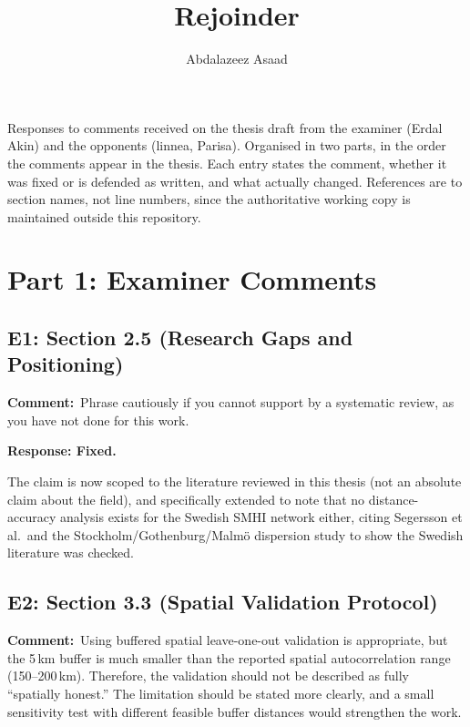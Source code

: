\documentclass[11pt,a4paper]{article}
\title{Rejoinder}
\author{Abdalazeez Asaad}
\date{}
\newcommand{\rjcomment}[1]{\par\noindent\textbf{Comment:}\ #1\par}
\newcommand{\rjresponse}[1]{\par\noindent\textbf{Response: #1}\par}
\begin{document}
\maketitle

Responses to comments received on the thesis draft from the examiner (Erdal Akin) and the
opponents (linnea, Parisa). Organised in two parts, in the order the comments appear in the
thesis. Each entry states the comment, whether it was fixed or is defended as written, and
what actually changed. References are to section names, not line numbers, since the
authoritative working copy is maintained outside this repository.

\section{Part 1: Examiner Comments}

\subsection{E1: Section 2.5 (Research Gaps and Positioning)}

\rjcomment{Phrase cautiously if you cannot support by a systematic review, as you have not
done for this work.}

\rjresponse{Fixed.}
The claim is now scoped to the literature reviewed in this thesis (not an absolute claim about
the field), and specifically extended to note that no distance-accuracy analysis exists for the
Swedish SMHI network either, citing Segersson et al.\ and the Stockholm/Gothenburg/Malm\"o
dispersion study to show the Swedish literature was checked.

\subsection{E2: Section 3.3 (Spatial Validation Protocol)}

\rjcomment{Using buffered spatial leave-one-out validation is appropriate, but the 5\,km buffer
is much smaller than the reported spatial autocorrelation range (150--200\,km). Therefore, the
validation should not be described as fully ``spatially honest.'' The limitation should be
stated more clearly, and a small sensitivity test with different feasible buffer distances would
strengthen the work.}
\end{document}
